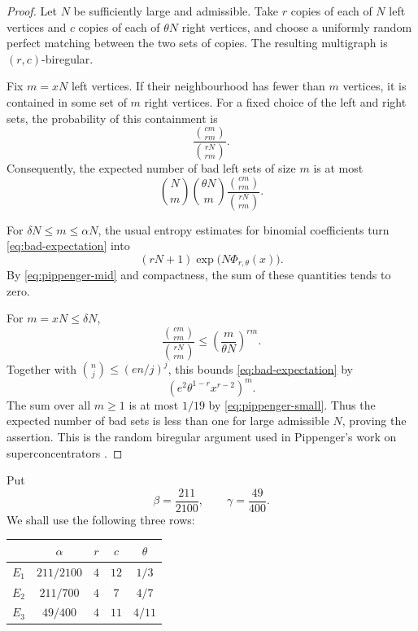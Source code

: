 \documentclass[11pt,a4paper]{amsart}
\begin{document}
\begin{proof}
Let \(N\) be sufficiently large and admissible.  Take \(r\) copies of each
of \(N\) left vertices and \(c\) copies of each of \(\theta N\) right
vertices, and choose a uniformly random perfect matching between the two sets
of copies.  The resulting multigraph is \((r,c)\)-biregular.

Fix \(m=xN\) left vertices.  If their neighbourhood has fewer than \(m\)
vertices, it is contained in some set of \(m\) right vertices.  For a fixed
choice of the left and right sets, the probability of this containment is
\[
        \frac{\binom{cm}{rm}}{\binom{rN}{rm}}.
\]
Consequently, the expected number of bad left sets of size \(m\) is at most
\begin{equation}\label{eq:bad-expectation}
 \binom Nm\binom{\theta N}m
 \frac{\binom{cm}{rm}}{\binom{rN}{rm}}.
\end{equation}

For \(\delta N\leqslant m\leqslant\alpha N\), the usual entropy estimates
for binomial coefficients \cite[Appendix~A]{AlonSpencer} turn
\eqref{eq:bad-expectation} into
\[
        (rN+1)\exp\bigl(N\Phi_{r,\theta}(x)\bigr).
\]
By \eqref{eq:pippenger-mid} and compactness, the sum of these quantities tends
to zero.

For \(m=xN\leqslant\delta N\),
\[
 \frac{\binom{cm}{rm}}{\binom{rN}{rm}}
 \leqslant\left(\frac{m}{\theta N}\right)^{rm}.
\]
Together with \(\binom nj\leqslant(en/j)^j\), this bounds
\eqref{eq:bad-expectation} by
\[
        \left(e^2\theta^{1-r}x^{r-2}\right)^m.
\]
The sum over all \(m\geqslant1\) is at most \(1/19\) by
\eqref{eq:pippenger-small}.  Thus the expected number of bad sets is less
than one for large admissible \(N\), proving the assertion.  This is the
random biregular argument used in Pippenger's work on superconcentrators
\cite{Pippenger}.
\end{proof}

Put
\begin{equation}\label{eq:caps}
        \beta=\frac{211}{2100},
        \qquad
        \gamma=\frac{49}{400}.
\end{equation}
We shall use the following three rows:
\begin{center}
\begin{tabular}{c c c c c}
\toprule
 & \(\alpha\) & \(r\) & \(c\) & \(\theta\)\\
\midrule
\(E_1\) & \(211/2100\) & \(4\) & \(12\) & \(1/3\)\\
\(E_2\) & \(211/700\)  & \(4\) & \(7\)  & \(4/7\)\\
\(E_3\) & \(49/400\)   & \(4\) & \(11\) & \(4/11\)\\
\bottomrule
\end{tabular}
\end{center}
\end{document}
